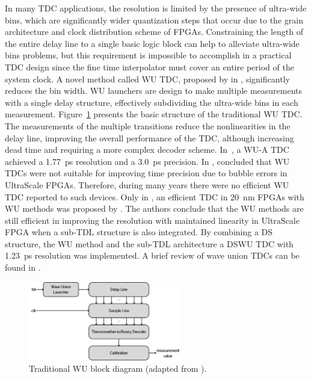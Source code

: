 In many \gls{TDC} applications, the resolution is limited by the presence of ultra-wide bins, which are significantly wider quantization steps that occur due to the grain architecture and clock distribution scheme of \glspl{FPGA}. Constraining the length of the entire delay line to a single basic logic block can help to alleviate ultra-wide bins problems, but this requirement is impossible to accomplish in a practical \gls{TDC} design since the fine time interpolator must cover an entire period of the system clock. A novel method called \gls{WU} \gls{TDC}, proposed by \citet{wu_first} in \citeyear{wu_first}, significantly reduces the bin width. \gls{WU} launchers are design to make multiple measurements with a single delay structure, effectively subdividing the ultra-wide bins in each measurement. Figure~\ref{fig:wu_bd} presents the basic structure of the traditional \gls{WU} \gls{TDC}. The measurements of the multiple transitions reduce the nonlinearities in the delay line, improving the overall performance of the \gls{TDC}, although increasing dead time and requiring a more complex decoder scheme. In~\citep{wu_ex}, a \gls{WU}-A \gls{TDC} achieved a 1.77~ps resolution and a 3.0~ps precision. In \citeyear{wu_not_suitable_ultrascalte}, \citet{wu_not_suitable_ultrascalte} concluded that \gls{WU} \glspl{TDC} were not suitable for improving time precision due to bubble errors in UltraScale \glspl{FPGA}. Therefore, during many years there were no efficient \gls{WU} \gls{TDC} reported to such devices. Only in \citeyear{wu_novel_ultrascale}, an efficient \gls{TDC} in 20~nm \glspl{FPGA} with \gls{WU} methods was proposed by \citet{wu_novel_ultrascale}. The authors conclude that the \gls{WU} methods are still efficient in improving the resolution with maintained linearity in UltraScale \gls{FPGA} when a sub-\gls{TDL} structure is also integrated. By combining a \gls{DS} structure, the \gls{WU} method and the sub-\gls{TDL} architecture a \gls{DS}\gls{WU} \gls{TDC} with 1.23~ps resolution was implemented. A brief review of wave union \glspl{TDC} can be found in \citep{wu_brief_review}.

\begin{figure}[ht!]
	\centering
	\includegraphics[width=0.6\textwidth]{img/02_StateofArt/wu.png}
	\caption{Traditional WU block diagram (adapted from \citep{wu_brief_review}).}
	\label{fig:wu_bd}
\end{figure}

